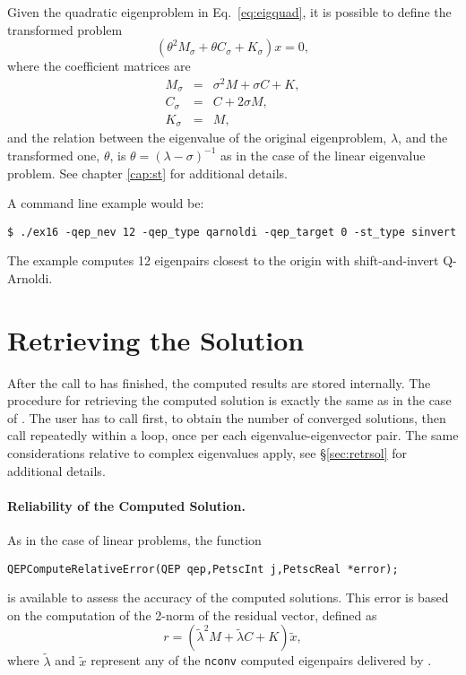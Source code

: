 Given the quadratic eigenproblem in Eq.\ \ref{eq:eigquad}, it is possible to define the transformed problem
\begin{equation}
(\theta^2M_\sigma+\theta C_\sigma+K_\sigma)x=0,\label{eq:sinvquad}
\end{equation}
where the coefficient matrices are
\begin{eqnarray}
M_\sigma&\!\!=\!\!&\sigma^2 M+\sigma C+K,\\
C_\sigma&\!\!=\!\!&C+2\sigma M,\\
K_\sigma&\!\!=\!\!&M,
\end{eqnarray}
and the relation between the eigenvalue of the original eigenproblem, $\lambda$, and the transformed one, $\theta$, is $\theta=(\lambda-\sigma)^{-1}$ as in the case of the linear eigenvalue problem. See chapter \ref{cap:st} for additional details.

A command line example would be:
	\begin{Verbatim}[fontsize=\small]
	$ ./ex16 -qep_nev 12 -qep_type qarnoldi -qep_target 0 -st_type sinvert
	\end{Verbatim}
The example computes 12 eigenpairs closest to the origin with shift-and-invert Q-Arnoldi.

\section{Retrieving the Solution}

After the call to  has finished, the computed results are stored internally. The procedure for retrieving the computed solution is exactly the same as in the case of . The user has to call  first, to obtain the number of converged solutions, then call  repeatedly within a loop, once per each eigenvalue-eigenvector pair. The same considerations relative to complex eigenvalues apply, see \S\ref{sec:retrsol} for additional details.

\paragraph{Reliability of the Computed Solution.}

As in the case of linear problems, the function
	\begin{Verbatim}[fontsize=\small]
	QEPComputeRelativeError(QEP qep,PetscInt j,PetscReal *error);
	\end{Verbatim}
is available to assess the accuracy of the computed solutions. This error is based on the computation of the 2-norm of the residual vector, defined as
\begin{equation}
r=(\tilde{\lambda}^2M+\tilde{\lambda} C+K)\tilde{x},\label{eq:resquad}
\end{equation}
where $\tilde{\lambda}$ and $\tilde{x}$ represent any of the \texttt{nconv} computed eigenpairs delivered by .

